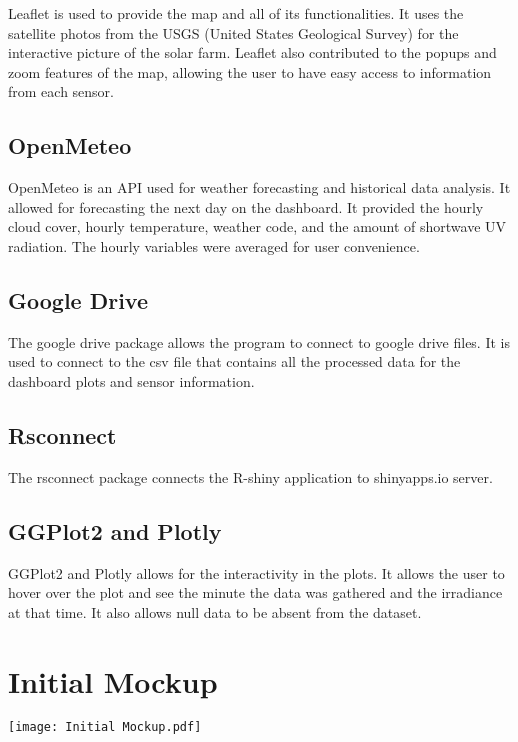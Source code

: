 \documentclass{sigchi}
\begin{document}
Leaflet is used to provide the map and all of its functionalities. It uses the satellite photos from the USGS (United States Geological Survey) for the interactive picture of the solar farm. Leaflet also contributed to the popups and zoom features of the map, allowing the user to have easy access to information from each sensor.\cite{Leaflet}

\subsection{OpenMeteo}

OpenMeteo is an API used for weather forecasting and historical data analysis. It allowed for forecasting the next day on the dashboard. It provided the hourly cloud cover, hourly temperature, weather code, and the amount of shortwave UV radiation. The hourly variables were averaged for user convenience.\cite{OpenMeteo}

\subsection{Google Drive}
The google drive package allows the program to connect to google drive files. It is used to connect to the csv file that contains all the processed data for the dashboard plots and sensor information.\cite{GD}

\subsection{Rsconnect}
The rsconnect package connects the R-shiny application to shinyapps.io server. \cite{RSConnect}

\subsection{GGPlot2 and Plotly}
GGPlot2 and Plotly allows for the interactivity in the plots. It allows the user to hover over the plot and see the minute the data was gathered and the irradiance at that time. It also allows null data to be absent from the dataset. 

\section{Initial Mockup}
\texttt{[image: Initial Mockup.pdf]}
\label{fig:initial-mockup}
\end{document}

